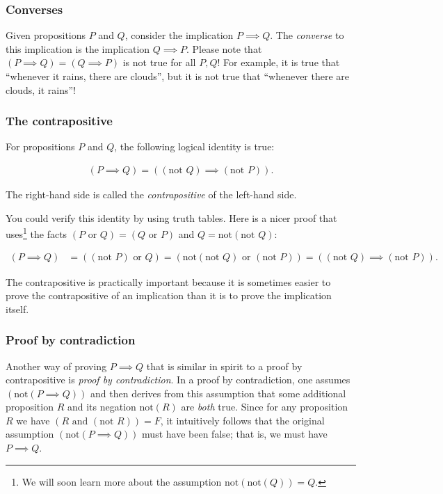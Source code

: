 \subsubsection*{Converses}

Given propositions $P$ and $Q$, consider the implication $P \implies Q$. The \textit{converse} to this implication is the implication $Q \implies P$. Please note that $(P \implies Q) = (Q \implies P)$ is not true for all $P, Q$! For example, it is true that ``whenever it rains, there are clouds'', but it is not true that ``whenever there are clouds, it rains''!

\subsubsection*{The contrapositive}

For propositions $P$ and $Q$, the following logical identity is true:

\begin{align*}
    (P \implies Q) = ((\text{not } Q) \implies (\text{not } P)).
\end{align*}

The right-hand side is called the \textit{contrapositive} of the left-hand side.

You could verify this identity by using truth tables. Here is a nicer proof that uses\footnote{We will soon learn more about the assumption $\text{not}(\text{not}(Q)) = Q$.} the facts $(P \text{ or } Q) = (Q \text{ or } P)$ and $Q = \text{not}(\text{not } Q)$:

\begin{align*}
    (P \implies Q) &= ((\text{not } P) \text{ or } Q ) 
    = (\text{not}(\text{not } Q) \text{ or } (\text{not } P))
    = ((\text{not } Q) \implies (\text{not } P)).
\end{align*}

The contrapositive is practically important because it is sometimes easier to prove the contrapositive of an implication than it is to prove the implication itself.

\subsubsection*{Proof by contradiction}

Another way of proving $P \implies Q$ that is similar in spirit to a proof by contrapositive is \textit{proof by contradiction}. In a proof by contradiction, one assumes $(\text{not}(P \implies Q))$ and then derives from this assumption that some additional proposition $R$ and its negation $\text{not}(R)$ are \textit{both} true. Since for any proposition $R$ we have $(R \text{ and } (\text{not } R)) = F$, it intuitively follows that the original assumption $(\text{not}(P \implies Q))$ must have been false; that is, we must have $P \implies Q$.


